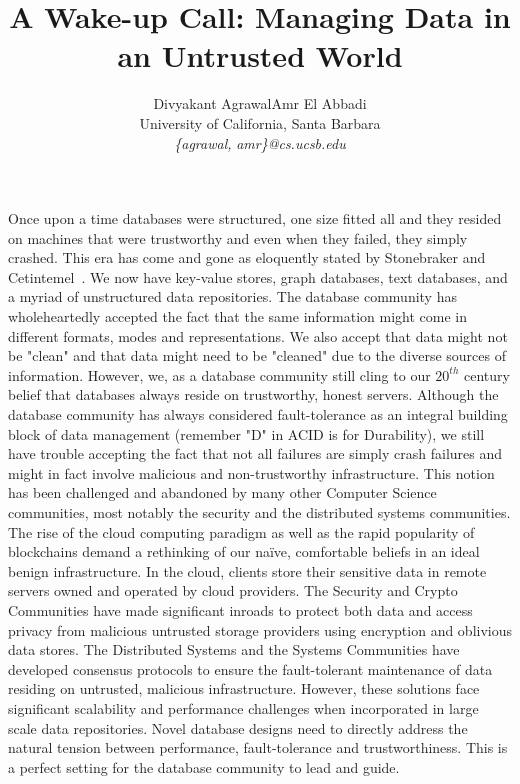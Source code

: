 \documentclass[11pt]{article}
\begin{document}
\title{A Wake-up Call: Managing Data in an Untrusted World}
\author{Divyakant Agrawal\qquad Amr El Abbadi\\
  University of California, Santa Barbara\\
  \textit{\{agrawal,}  \textit{amr\}@cs.ucsb.edu}}
\vspace{1cm}

Once upon a time databases were structured, one size fitted all and they resided on machines that were trustworthy and even when they failed, they simply crashed.  This era has come and gone as eloquently stated by Stonebraker and Cetintemel~\cite{StonebrakerICDE2005}.  We now have key-value stores, graph databases, text databases, and a myriad of unstructured data repositories. The database community has wholeheartedly accepted the fact that the same information might come in different formats, modes and representations.  We also accept that data might not be "clean" and that data might need to be "cleaned" due to the diverse sources of information. However, we, as a database community still cling to our $20^{th}$ century belief that databases always reside on trustworthy, honest servers. Although the database community has always considered fault-tolerance as an integral building block of data management (remember "D" in ACID is for Durability), we still have trouble accepting the fact that not all failures are simply crash failures and might in fact involve malicious and non-trustworthy infrastructure. This notion has been challenged and abandoned by many other Computer Science communities, most notably the security and the distributed systems communities.  The rise of the cloud computing paradigm as well as the rapid popularity of blockchains demand a rethinking of our naïve, comfortable  beliefs in an ideal benign infrastructure.  In the cloud, clients store their sensitive data in remote servers owned and operated by cloud providers. The Security and Crypto Communities have made significant inroads to protect both data and access privacy from malicious untrusted storage providers using encryption and oblivious data stores.  The Distributed Systems and the Systems Communities have developed consensus protocols to ensure the fault-tolerant maintenance of data residing on untrusted, malicious infrastructure.  However, these solutions face significant scalability and performance challenges when incorporated in large scale data repositories. Novel database designs need to directly address the natural tension between performance, fault-tolerance and trustworthiness.  This is a perfect setting for the database community to lead and guide.  
\end{document}
